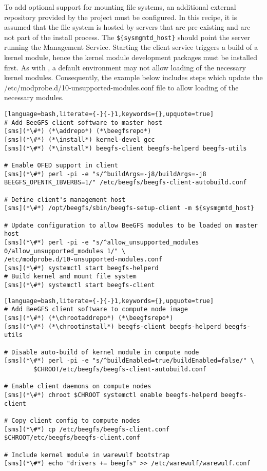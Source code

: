 To add optional support for mounting \beegfs{} file systems, an 
additional external \pkgmgr{} repository provided by the \beegfs{} project must be 
configured.  In this recipe, it is
assumed that the file system is hosted by servers that are pre-existing
and are not part of the install process. The \texttt{\$\{sysmgmtd\_host\}} should
point the server running the \beegfs{} Management Service. Starting the client service triggers
a build of a kernel module, hence the kernel module development packages must be
installed first. As with \Lustre{}, a default \baseOS{} environment may not allow 
loading of the necessary \beegfs{} kernel modules. Consequently, the example below 
includes steps which update the /etc/modprobe.d/10-unsupported-modules.conf file 
to allow loading of the necessary modules.

\begin{lstlisting}[language=bash,literate={-}{-}1,keywords={},upquote=true]
# Add BeeGFS client software to master host
[sms](*\#*) (*\addrepo*) (*\beegfsrepo*)
[sms](*\#*) (*\install*) kernel-devel gcc
[sms](*\#*) (*\install*) beegfs-client beegfs-helperd beegfs-utils

# Enable OFED support in client
[sms](*\#*) perl -pi -e "s/^buildArgs=-j8/buildArgs=-j8 BEEGFS_OPENTK_IBVERBS=1/" /etc/beegfs/beegfs-client-autobuild.conf

# Define client's management host
[sms](*\#*) /opt/beegfs/sbin/beegfs-setup-client -m ${sysmgmtd_host}

# Update configuration to allow BeeGFS modules to be loaded on master host
[sms](*\#*) perl -pi -e "s/^allow_unsupported_modules 0/allow_unsupported_modules 1/" \
/etc/modprobe.d/10-unsupported-modules.conf
[sms](*\#*) systemctl start beegfs-helperd
# Build kernel and mount file system
[sms](*\#*) systemctl start beegfs-client
\end{lstlisting}

\begin{lstlisting}[language=bash,literate={-}{-}1,keywords={},upquote=true]
# Add BeeGFS client software to compute node image
[sms](*\#*) (*\chrootaddrepo*) (*\beegfsrepo*)
[sms](*\#*) (*\chrootinstall*) beegfs-client beegfs-helperd beegfs-utils

# Disable auto-build of kernel module in compute node
[sms](*\#*) perl -pi -e "s/^buildEnabled=true/buildEnabled=false/" \ 
        $CHROOT/etc/beegfs/beegfs-client-autobuild.conf

# Enable client daemons on compute nodes
[sms](*\#*) chroot $CHROOT systemctl enable beegfs-helperd beegfs-client

# Copy client config to compute nodes
[sms](*\#*) cp /etc/beegfs/beegfs-client.conf $CHROOT/etc/beegfs/beegfs-client.conf

# Include kernel module in warewulf bootstrap
[sms](*\#*) echo "drivers += beegfs" >> /etc/warewulf/warewulf.conf
\end{lstlisting}
